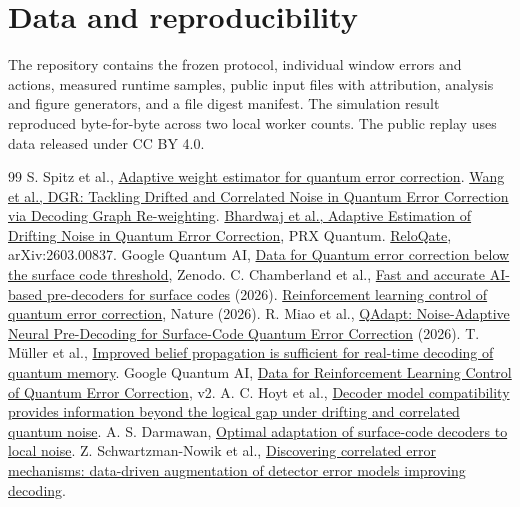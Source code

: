 \documentclass[10pt]{article}
\begin{document}
\section*{Data and reproducibility}
The repository contains the frozen protocol, individual window errors and actions, measured runtime samples, public input files with attribution, analysis and figure generators, and a file digest manifest. The simulation result reproduced byte-for-byte across two local worker counts. The public replay uses data released under CC BY 4.0.
\begin{thebibliography}{99}
 S. Spitz et al., \href{https://arxiv.org/abs/1712.02360}{Adaptive weight estimator for quantum error correction}.
 \href{https://arxiv.org/abs/2311.16214}{Wang et al., DGR: Tackling Drifted and Correlated Noise in Quantum Error Correction via Decoding Graph Re-weighting}.
 \href{https://doi.org/10.1103/z1hc-nqw5}{Bhardwaj et al., Adaptive Estimation of Drifting Noise in Quantum Error Correction}, PRX Quantum.
 \href{https://arxiv.org/abs/2603.00837}{ReloQate}, arXiv:2603.00837.
 Google Quantum AI, \href{https://zenodo.org/records/13273331}{Data for Quantum error correction below the surface code threshold}, Zenodo.
 C. Chamberland et al., \href{https://arxiv.org/abs/2604.12841}{Fast and accurate AI-based pre-decoders for surface codes} (2026).
 \href{https://doi.org/10.1038/s41586-026-10759-2}{Reinforcement learning control of quantum error correction}, Nature (2026).
 R. Miao et al., \href{https://arxiv.org/abs/2607.28422v3}{QAdapt: Noise-Adaptive Neural Pre-Decoding for Surface-Code Quantum Error Correction} (2026).
 T. M\"uller et al., \href{https://arxiv.org/abs/2506.01779}{Improved belief propagation is sufficient for real-time decoding of quantum memory}.
 Google Quantum AI, \href{https://zenodo.org/records/18896801}{Data for Reinforcement Learning Control of Quantum Error Correction}, v2.
 A. C. Hoyt et al., \href{https://arxiv.org/abs/2609.29018}{Decoder model compatibility provides information beyond the logical gap under drifting and correlated quantum noise}.
 A. S. Darmawan, \href{https://arxiv.org/abs/2403.08706}{Optimal adaptation of surface-code decoders to local noise}.
 Z. Schwartzman-Nowik et al., \href{https://arxiv.org/abs/2611.06605}{Discovering correlated error mechanisms: data-driven augmentation of detector error models improving decoding}.
\end{thebibliography}
\end{document}
